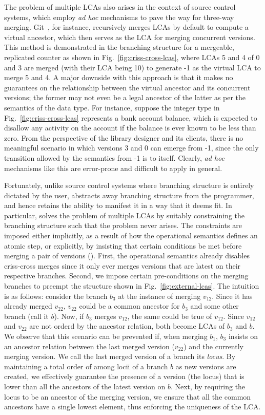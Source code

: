 The problem of multiple LCAs also arises in the context of source
control systems, which employ \emph{ad hoc} mechanisms to pave the way
for three-way merging.  Git~\cite{git}, for instance,
recursively merges LCAs by default to compute a virtual ancestor, which then
serves as the LCA for merging concurrent versions. This method is
demonstrated in the branching structure for a mergeable, replicated
counter as shown in Fig.~\ref{fig:criss-cross-lcas}, where LCAs 5 and
4 of 0 and 3 are merged (with their LCA being 10) to generate -1 as
the virtual LCA to merge 5 and 4. A major downside with this approach
is that it makes no guarantees on the relationship between the virtual
ancestor and its concurrent versions; the former may not even be a
legal ancestor of the latter as per the semantics of the data type.
For instance, suppose the integer type in
Fig.~\ref{fig:criss-cross-lcas} represents a bank account balance,
which is expected to disallow any activity on the account if the
balance is ever known to be less than zero.  From the perspective of
the library designer and its clients, there is no meaningful scenario
in which versions 3 and 0 can emerge from -1, since the only
transition allowed by the semantics from -1 is to itself.  Clearly,
\emph{ad hoc} mechanisms like this are error-prone and difficult to
apply in general.

Fortunately, unlike source control systems where branching structure
is entirely dictated by the user, \name abstracts away branching
structure from the programmer, and hence retains the ability to
manifest it in a way that it deems fit. In particular, \name solves
the problem of multiple LCAs by suitably constraining the branching
structure such that the problem never arises. The constraints are
imposed either implicitly, as a result of how the operational semantics
defines an atomic step, or explicitly, by insisting that certain
conditions be met before merging a pair of versions
(). First, the operational semantics already
disables criss-cross merges since it only ever merges versions that
are latest on their respective branches. Second, we impose certain
pre-conditions on the merging branches to preempt the structure shown
in Fig.~\ref{fig:external-lcas}. The intuition is as follows: consider
the branch $b_3$ at the instance of merging $v_{12}$. Since it has
already merged $v_{22}$, $v_{22}$ could be a common ancestor for $b_3$
and some other branch (call it $b$). Now, if $b_3$ merges $v_{12}$,
the same could be true of $v_{12}$. Since $v_{12}$ and $v_{22}$ are not
orderd by the ancestor relation, both become LCAs of
$b_3$ and $b$. We observe that this scenario can be prevented if, when
merging $b_1$, $b_3$ insists on an ancestor relation between the last
merged version ($v_{22}$) and the currently merging version.  We call
the last merged version of a branch its \emph{locus}. By maintaining a
total order of among locii of a branch $b$ as new versions are
created, we effectively guarantee the presence of a version (the
locus) that is lower than all the ancestors of the latest version on
$b$. Next, by requiring the locus to be an ancestor of the merging
version, we ensure that all the common ancestors have a single lowest
element, thus enforcing the uniqueness of the LCA.

